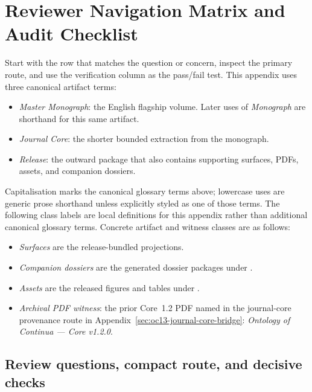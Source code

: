 \section{Reviewer Navigation Matrix and Audit Checklist}
\label{sec:oc13-reviewer-navigation}

Start with the row that matches the question or concern, inspect the primary
route, and use the verification column as the pass/fail test.
This appendix uses three canonical artifact terms:
\begin{itemize}[leftmargin=1.6em,nosep]
\item \emph{Master Monograph}: the English flagship volume. Later uses of
      \emph{Monograph} are shorthand for this same artifact.
\item \emph{Journal Core}: the shorter bounded extraction from the monograph.
\item \emph{Release}: the outward package that also contains supporting
      surfaces, PDFs, assets, and companion dossiers.
\end{itemize}
Capitalisation marks the canonical glossary terms above; lowercase uses are
generic prose shorthand unless explicitly styled as one of those terms.
The following class labels are local definitions for this appendix rather than
additional canonical glossary terms.
Concrete artifact and witness classes are as follows:
\begin{itemize}[leftmargin=1.6em,nosep]
\item \emph{Surfaces} are the release-bundled
       projections.
\item \emph{Companion dossiers} are the generated dossier packages under
      .
\item \emph{Assets} are the released figures and tables under
      .
\item \emph{Archival PDF witness}: the prior Core~1.2 PDF named in the
      journal-core provenance route in
      Appendix~\ref{sec:oc13-journal-core-bridge}: \emph{Ontology of
      Continua --- Core v1.2.0}.
\end{itemize}

\subsection{Review questions, compact route, and decisive checks}

\begingroup
\footnotesize
\RaggedRight
\setlength{\emergencystretch}{1.5em}
\setlength{\tabcolsep}{3pt}
\setlength{\LTleft}{0pt}
\setlength{\LTright}{0pt}


